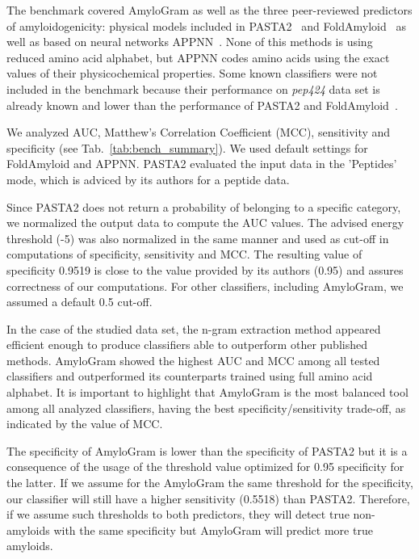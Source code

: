 \documentclass[fleqn,10pt,twoside]{gcb15submission}
\begin{document}
The benchmark covered AmyloGram as well as the three peer-reviewed predictors of 
amyloidogenicity: physical models included in PASTA2~\citep{walsh_pasta_2014} and 
FoldAmyloid~\citep{garbuzynskiy_foldamyloid:_2010} as well as based on neural networks 
APPNN~\citep{familia_prediction_2015}. None of this methods is using 
reduced amino acid alphabet, but APPNN codes amino acids using the exact 
values of their physicochemical properties. Some known classifiers were 
not included in the benchmark because their performance on \textit{pep424} 
data set is already known and lower than the performance of PASTA2 and 
FoldAmyloid~\citep{walsh_pasta_2014}.

  We analyzed AUC, Matthew's Correlation Coefficient 
%
%
%
(MCC), sensitivity and specificity (see Tab.~\ref{tab:bench_summary}). We used 
default settings for FoldAmyloid and APPNN. PASTA2 evaluated the input data in the 
'Peptides' mode, which is adviced by its authors for a peptide data.

  Since PASTA2 does not return a probability of belonging to a specific category, 
we normalized the output data to compute the AUC values. The advised energy 
threshold (-5) was also normalized in the same manner and used as cut-off in 
computations of specificity, sensitivity and MCC. The resulting value of 
specificity 0.9519 is close to the value provided by its authors (0.95) and assures 
correctness of our computations. For other classifiers, including AmyloGram, we assumed a 
default 0.5 cut-off.
    
  In the case of the studied data set, the n-gram extraction method appeared 
efficient enough to produce classifiers able to outperform other published 
methods. AmyloGram showed the highest AUC and MCC among all tested classifiers 
and outperformed its counterparts trained using full amino acid alphabet. It 
is important to highlight that AmyloGram is the most balanced tool among all analyzed 
classifiers, having the best specificity/sensitivity trade-off, as indicated by 
the value of MCC.
 
  The specificity of AmyloGram is lower than the specificity of PASTA2 but it is 
a consequence of the usage of the threshold value optimized for 0.95 specificity 
for the latter. If we assume for the AmyloGram the same threshold for the 
specificity, our classifier will still have a higher sensitivity (0.5518) than 
PASTA2. Therefore, if we assume such thresholds to both predictors, they will detect true 
non-amyloids with the same specificity but AmyloGram will predict more true amyloids. 
\end{document}
